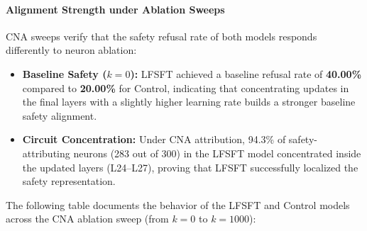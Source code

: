 \documentclass[11pt]{article}
\begin{document}
\paragraph{Alignment Strength under Ablation Sweeps}
CNA sweeps verify that the safety refusal rate of both models responds differently to neuron ablation:
\begin{itemize}
    \item \textbf{Baseline Safety ($k=0$):} LFSFT achieved a baseline refusal rate of \textbf{40.00\%} compared to \textbf{20.00\%} for Control, indicating that concentrating updates in the final layers with a slightly higher learning rate builds a stronger baseline safety alignment.
    \item \textbf{Circuit Concentration:} Under CNA attribution, 94.3\% of safety-attributing neurons (283 out of 300) in the LFSFT model concentrated inside the updated layers (L24--L27), proving that LFSFT successfully localized the safety representation.
\end{itemize}

The following table documents the behavior of the LFSFT and Control models across the CNA ablation sweep (from $k=0$ to $k=1000$):

\begin{table}[h]
\centering
\caption{Safety Refusal Rates and Quality Scores Under CNA Sweeps}
\label{tab:lfsft_cna_sweeps}
\end{table}
\end{document}
